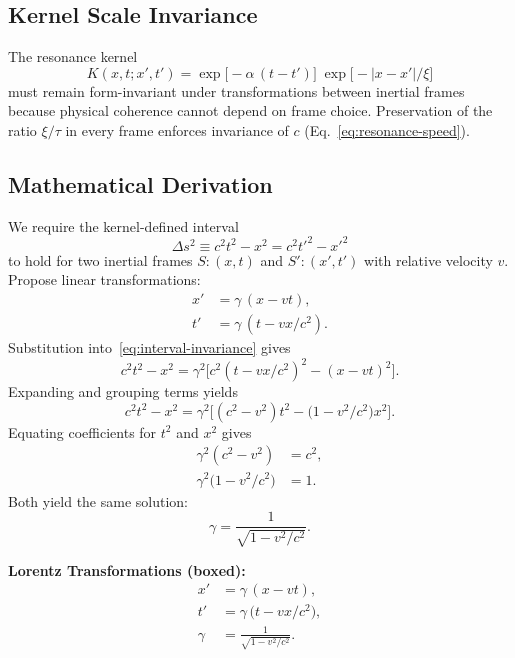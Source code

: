 \subsection{Kernel Scale Invariance}
The resonance kernel
\[
  K(x,t;x',t')
  = \exp\!\bigl[-\alpha\,(t - t')\bigr]\;\exp\!\bigl[-|x - x'|/\xi\bigr]
\]
must remain form-invariant under transformations between inertial frames because physical coherence cannot depend on frame choice.  Preservation of the ratio \(\xi/\tau\) in every frame enforces invariance of \(c\) (Eq.~\ref{eq:resonance-speed}).

\subsection{Mathematical Derivation}
We require the kernel-defined interval
\begin{equation}
  \Delta s^2 \equiv c^2 t^2 - x^2
  = c^2 t'^{2} - x'^{2}
  \label{eq:interval-invariance}
\end{equation}
to hold for two inertial frames \(S:(x,t)\) and \(S':(x',t')\) with relative velocity \(v\).  Propose linear transformations:
\begin{align}
  x' &= \gamma\,(x - v t), \label{eq:ansatz-x} \\
  t' &= \gamma\,(t - v x/c^2). \label{eq:ansatz-t}
\end{align}
Substitution into~\eqref{eq:interval-invariance} gives
\[
  c^2 t^2 - x^2 
  = \gamma^2\bigl[c^2(t - vx/c^2)^2 - (x - vt)^2\bigr].
\]
Expanding and grouping terms yields
\[
  c^2 t^2 - x^2 
  = \gamma^2\bigl[(c^2 - v^2)t^2 - \bigl(1 - v^2/c^2\bigr)x^2\bigr].
\]
Equating coefficients for \(t^2\) and \(x^2\) gives
\begin{align}
  \gamma^2(c^2 - v^2) &= c^2, \label{eq:gamma-coeff1} \\
  \gamma^2\bigl(1 - v^2/c^2\bigr) &= 1. \label{eq:gamma-coeff2}
\end{align}
Both yield the same solution:
\begin{equation}
  \gamma = \frac{1}{\sqrt{1 - v^2/c^2}}.
  \label{eq:gamma-factor}
\end{equation}

\begin{framed}
\noindent\textbf{Lorentz Transformations (boxed):}
\begin{align}
  x' &= \gamma\,(x - v t), \label{eq:lorentz-x}\\
  t' &= \gamma\,\bigl(t - v x/c^2\bigr), \label{eq:lorentz-t}\\
  \gamma &= \frac{1}{\sqrt{1 - v^2/c^2}}. \nonumber
\end{align}
\end{framed}

